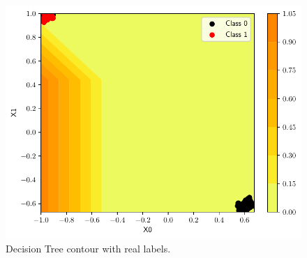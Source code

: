 \documentclass[conference]{IEEEtran}
\theoremstyle{definition}
\theoremstyle{remark}
\theoremstyle{remark}
\begin{document}
\begin{figure}
    \includegraphics[width=\columnwidth]{figs/tree-contour-0-1.pdf}
    \caption{Decision Tree contour with real labels.}
\end{figure}
\end{document}
